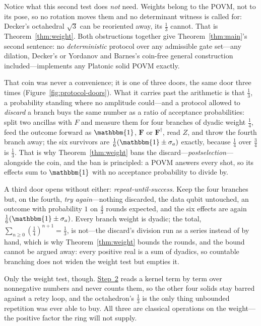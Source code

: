 \documentclass[11pt,a4paper]{article}
\newcommand{\Id}{\mathbbm{1}}
\begin{document}
Notice what this second test does \textit{not} need. Weights belong to the POVM, not to its pose, so no rotation moves them and no determinant witness is called for: Decker's octahedral $\sqrt{3}$ can be reoriented away, its $\tfrac{1}{3}$ cannot. That is Theorem~\ref{thm:weight}. Both obstructions together give Theorem~\ref{thm:main}'s second sentence: no \textit{deterministic} protocol over any admissible gate set---any dilation, Decker's or Yordanov and Barnes's coin-free general construction~\cite[Eq.~(8)]{yordanov2019implementationgeneralsinglequbit} included---implements any Platonic solid POVM exactly.

That coin was never a convenience; it is one of three doors, the same door three times (Figure~\ref{fig:protocol-doors}). What it carries past the arithmetic is that $\tfrac{1}{3}$, a probability standing where no amplitude could---and a protocol allowed to \textit{discard} a branch buys the same number as a ratio of acceptance probabilities: split two ancillas with $F$ and measure them for four branches of dyadic weight $\tfrac{1}{4}$, feed the outcome forward as $\Id$, $\mathbf{F}$ or $\mathbf{F}^\dagger$, read $Z$, and throw the fourth branch away; the six survivors are $\tfrac{1}{6}(\Id \pm \sigma_a)$ exactly, because $\tfrac{1}{4}$ over $\tfrac{3}{4}$ is $\tfrac{1}{3}$. That is why Theorem~\ref{thm:weight} bans the discard---\textit{postselection}---alongside the coin, and the ban is principled: a POVM answers every shot, so its effects sum to $\Id$ with no acceptance probability to divide by.

A third door opens without either: \textit{repeat-until-success}. Keep the four branches but, on the fourth, \textit{try again}---nothing discarded, the data qubit untouched, an outcome with probability $1$ on $\tfrac{4}{3}$ rounds expected, and the six effects are again $\tfrac{1}{6}(\Id \pm \sigma_a)$. Every branch weight is dyadic; the total, $\sum_{n \ge 0} (\tfrac{1}{4})^{n+1} = \tfrac{1}{3}$, is not---the discard's division run as a series instead of by hand, which is why Theorem~\ref{thm:weight} bounds the rounds, and the bound cannot be argued away: every positive real is a sum of dyadics, so countable branching does not widen the weight test but empties it.

Only the weight test, though. \hyperref[sec:decker:step2]{Step~2} reads a kernel term by term over nonnegative numbers and never counts them, so the other four solids stay barred against a retry loop, and the octahedron's $\tfrac{1}{3}$ is the only thing unbounded repetition was ever able to buy. All three are classical operations on the weight---the positive factor the ring will not supply.
\end{document}
